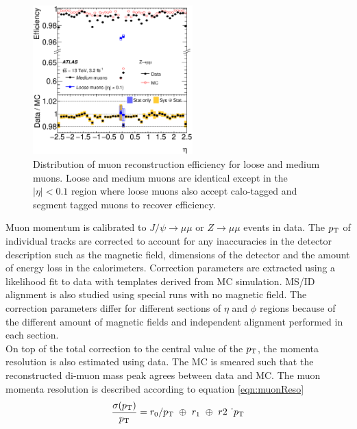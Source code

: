 \begin{figure}[htb]
  \begin{center}
    \includegraphics[width=0.55\textwidth]{figures/MuonReco/MuonEff.eps}\hspace{0.05\textwidth}
\end{center}
\caption{Distribution of muon reconstruction efficiency for loose and medium muons.\cite{MuonReco}  Loose and medium muons are identical except in the $|\eta| < 0.1$ region where loose muons also accept calo-tagged and segment tagged muons to recover efficiency.}
\label{fig:muoneff} 
\end{figure}

\indent Muon momentum is calibrated to $J/\psi\rightarrow \mu\mu$ or $Z\rightarrow\mu\mu$ events in data.  The $p_{\mathrm{T}}$ of individual tracks are corrected to account for any inaccuracies in the detector description such as the magnetic field, dimensions of the detector and the amount of energy loss in the calorimeters.  Correction parameters are extracted using a likelihood fit to data with templates derived from MC simulation. MS/ID alignment is also studied using special runs with no magnetic field. The correction parameters differ for different sections of $\eta$ and $\phi$ regions because of the different amount of magnetic fields and independent alignment performed in each section. \\

\indent On top of the total correction to the central value of the $p_{\mathrm{T}}$, the momenta resolution is also estimated using data.  The MC is smeared such that the reconstructed di-muon mass peak agrees between data and MC.  The muon momenta resolution is described according to equation \ref{eqn:muonReso}\\

\begin{equation}
\frac{\sigma(p_{\mathrm{T}})}{p_{\mathrm{T}}} = r_0/p_{\mathrm{T}}~\oplus~r_1~\oplus~r2~\dot~p_{\mathrm{T}}
\label{eqn:muonReso}
\end{equation}


